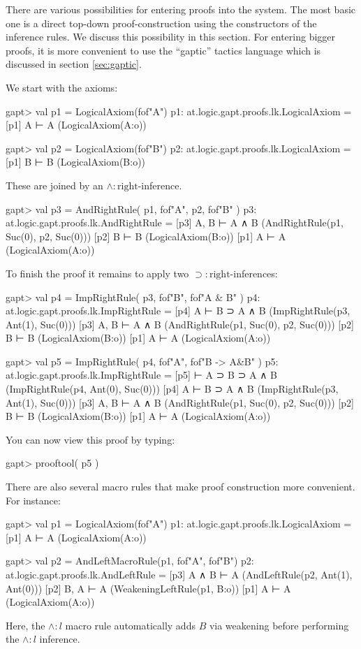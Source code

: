 \documentclass[a4paper,11pt]{article}
\newcommand{\impl}{\supset} %
\renewcommand{\land}{\wedge}
\begin{document}
There are various possibilities for entering proofs into the system. The most
basic one is a direct top-down proof-construction using the constructors
of the inference rules. We discuss this possibility in this section. For
entering bigger proofs, it is more convenient to use the ``gaptic'' tactics
language which is discussed in section \ref{sec:gaptic}.

We start with the axioms:
%
\begin{clilisting}
gapt> val p1 = LogicalAxiom(fof"A")
p1: at.logic.gapt.proofs.lk.LogicalAxiom =
[p1] A ⊢ A    (LogicalAxiom(A:o))

gapt> val p2 = LogicalAxiom(fof"B")
p2: at.logic.gapt.proofs.lk.LogicalAxiom =
[p1] B ⊢ B    (LogicalAxiom(B:o))

\end{clilisting}
%
These are joined by an $\land:\mathrm{right}$-inference.
\begin{clilisting}
gapt> val p3 = AndRightRule( p1, fof"A", p2, fof"B" )
p3: at.logic.gapt.proofs.lk.AndRightRule =
[p3] A, B ⊢ A ∧ B    (AndRightRule(p1, Suc(0), p2, Suc(0)))
[p2] B ⊢ B    (LogicalAxiom(B:o))
[p1] A ⊢ A    (LogicalAxiom(A:o))

\end{clilisting}
%
To finish the proof it remains to apply two $\impl:\mathrm{right}$-inferences:
%
\begin{clilisting}
gapt> val p4 = ImpRightRule( p3, fof"B", fof"A & B" )
p4: at.logic.gapt.proofs.lk.ImpRightRule =
[p4] A ⊢ B ⊃ A ∧ B    (ImpRightRule(p3, Ant(1), Suc(0)))
[p3] A, B ⊢ A ∧ B    (AndRightRule(p1, Suc(0), p2, Suc(0)))
[p2] B ⊢ B    (LogicalAxiom(B:o))
[p1] A ⊢ A    (LogicalAxiom(A:o))

gapt> val p5 = ImpRightRule( p4, fof"A", fof"B -> A&B" )
p5: at.logic.gapt.proofs.lk.ImpRightRule =
[p5]  ⊢ A ⊃ B ⊃ A ∧ B    (ImpRightRule(p4, Ant(0), Suc(0)))
[p4] A ⊢ B ⊃ A ∧ B    (ImpRightRule(p3, Ant(1), Suc(0)))
[p3] A, B ⊢ A ∧ B    (AndRightRule(p1, Suc(0), p2, Suc(0)))
[p2] B ⊢ B    (LogicalAxiom(B:o))
[p1] A ⊢ A    (LogicalAxiom(A:o))

\end{clilisting}
%
You can now view this proof by typing:
\begin{clilisting}
gapt> prooftool( p5 )

\end{clilisting}

There are also several macro rules that make proof construction more convenient.
For instance:
\begin{clilisting}
gapt> val p1 = LogicalAxiom(fof"A")
p1: at.logic.gapt.proofs.lk.LogicalAxiom =
[p1] A ⊢ A    (LogicalAxiom(A:o))

gapt> val p2 = AndLeftMacroRule(p1, fof"A", fof"B")
p2: at.logic.gapt.proofs.lk.AndLeftRule =
[p3] A ∧ B ⊢ A    (AndLeftRule(p2, Ant(1), Ant(0)))
[p2] B, A ⊢ A    (WeakeningLeftRule(p1, B:o))
[p1] A ⊢ A    (LogicalAxiom(A:o))

\end{clilisting}
Here, the $\land:l$ macro rule automatically adds $B$ via weakening before
performing the $\land:l$ inference.
\end{document}

